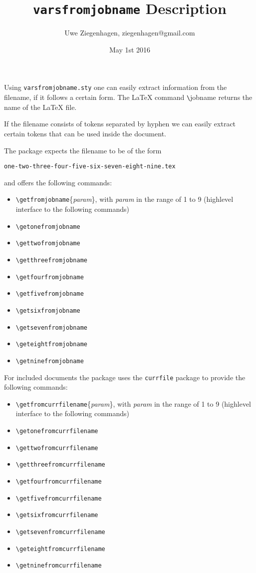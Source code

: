 \documentclass[12pt]{article}
\date{May 1st 2016}
\author{Uwe Ziegenhagen, ziegenhagen@gmail.com}
\title{\texttt{varsfromjobname} Description}
\begin{document}
\maketitle

\noindent Using \texttt{varsfromjobname.sty} one can easily extract information from the filename, if it follows a certain form. The LaTeX command \verb|\|jobname returns the name of the LaTeX file. 

If the filename consists of tokens separated by hyphen we can easily extract certain tokens that can be used inside the document. 

The package expects the filename to be of the form 

\noindent\texttt{one-two-three-four-five-six-seven-eight-nine.tex} 

\noindent and offers the following commands:

\begin{itemize}
	\item \verb|\getfromjobname|\{\textit{param}\}, with \textit{param} in the
	 range of 1 to 9 (highlevel interface to the following commands)
	\item \verb|\getonefromjobname|
	\item \verb|\gettwofromjobname|
	\item \verb|\getthreefromjobname|
	\item \verb|\getfourfromjobname|
	\item \verb|\getfivefromjobname|
	\item \verb|\getsixfromjobname|
	\item \verb|\getsevenfromjobname|
	\item \verb|\geteightfromjobname|
	\item \verb|\getninefromjobname|	
\end{itemize}

For included documents the package uses the \texttt{currfile} package to provide the following commands: 

\begin{itemize}
	\item \verb|\getfromcurrfilename|\{\textit{param}\}, with \textit{param} in the
	 range of 1 to 9 (highlevel interface to the following commands)
	\item \verb|\getonefromcurrfilename|
	\item \verb|\gettwofromcurrfilename|
	\item \verb|\getthreefromcurrfilename|
	\item \verb|\getfourfromcurrfilename|
	\item \verb|\getfivefromcurrfilename|
	\item \verb|\getsixfromcurrfilename|
	\item \verb|\getsevenfromcurrfilename|
	\item \verb|\geteightfromcurrfilename|
	\item \verb|\getninefromcurrfilename|	
\end{itemize}
\end{document}
